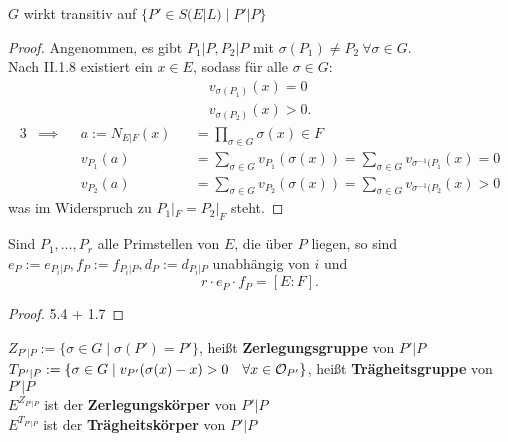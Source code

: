 \begin{satz}
    $G$ wirkt transitiv auf $\{P' \in S(E|L) \mid P' | P\}$
\end{satz}
\begin{proof}
    Angenommen, es gibt $P_1|P, P_2|P$ mit $\sigma(P_1) \ne P_2~\forall \sigma\in G$.\\
    Nach II.1.8 existiert ein $x \in E$, sodass für alle $\sigma \in G$:
    \begin{align*}
        v_{\sigma(P_1)}(x) = 0\\
        v_{\sigma(P_2)}(x) > 0.
    \end{align*}
    \begin{alignat*}{3}
        & \implies && a:= N_{E|F}(x) && = \prod_{\sigma \in G} \sigma(x) \in F\\
        & && v_{P_1}(a) && = \sum_{\sigma\in G} v_{P_1}(\sigma(x)) = \sum_{\sigma\in G} v_{\sigma^{-1}(P_1}(x) = 0\\
        & && v_{P_2}(a) && = \sum_{\sigma\in G} v_{P_2}(\sigma(x)) = \sum_{\sigma\in G} v_{\sigma^{-1}(P_2}(x) > 0
    \end{alignat*}
    was im Widerspruch zu $P_1|_F = P_2|_F$ steht.
\end{proof}

\begin{korollar}
    Sind $P_1, \ldots, P_r$ alle Primstellen von $E$, die über $P$ liegen, so sind $e_P:=e_{P_i|P}, f_P:= f_{P_i|P}, d_P:=d_{P_i|P}$
    unabhängig von $i$ und 
    $$ r \cdot e_P \cdot f_P = [E:F].$$
\end{korollar}
\begin{proof}
    5.4 + 1.7
\end{proof}

\begin{definition}
    $Z_{P'|P} := \{\sigma \in G \mid \sigma(P') = P'\}$, heißt \textbf{Zerlegungsgruppe} von $P'|P$\\
    $T_{P'|P} := \{\sigma \in G \mid v_{P'}(\sigma(x)-x)>0 \quad \forall x\in \mathcal{O}_{P'}\}$, heißt \textbf{Trägheitsgruppe} von $P'|P$\\
    $E^{Z_{P'|P}}$ ist der \textbf{Zerlegungskörper} von $P'|P$\\
    $E^{T_{P'|P}}$ ist der \textbf{Trägheitskörper} von $P'|P$
\end{definition}

